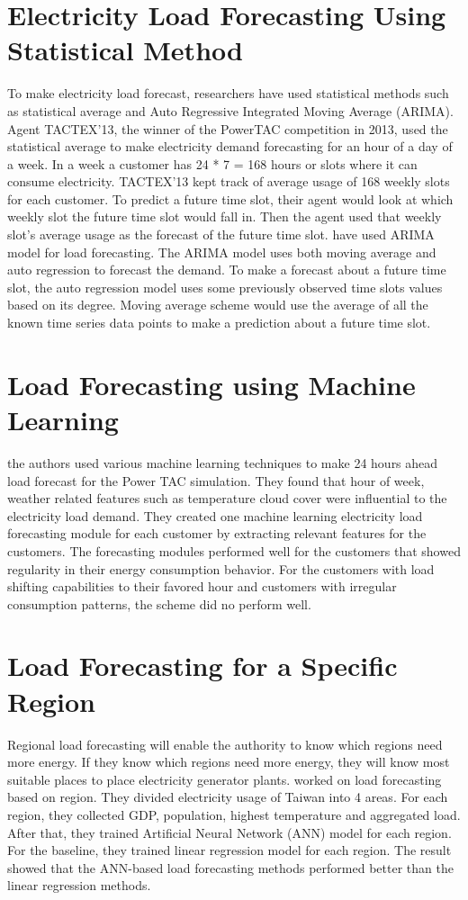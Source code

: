 \section{Electricity Load Forecasting Using Statistical Method}

To make electricity load forecast, researchers have used statistical methods such as statistical average and Auto Regressive Integrated Moving Average (ARIMA).  Agent TACTEX'13, the winner of the PowerTAC competition in 2013, used the statistical average to make electricity demand forecasting for an hour of a day of a week. In a week a customer has 24 * 7 = 168 hours or slots where it can consume electricity. TACTEX'13  kept track of average usage of 168 weekly slots for each customer. To predict a future time slot, their agent would look at which weekly slot the future time slot would fall in. Then the agent used that weekly slot's average usage as the forecast of the future time slot. \cite{cho1995customer} have used ARIMA model for load forecasting. The ARIMA model uses both moving average and auto regression to forecast the demand. To make a forecast about a future time slot, the auto regression model uses some previously observed time slots values based on its degree. Moving average scheme would use the average of all the known time series data points to make a prediction about a future time slot.    


\section{Load Forecasting using Machine Learning}
\cite{parra2013initial} the authors used various machine learning techniques to make 24 hours ahead load forecast for the Power TAC simulation. They found that hour of week, weather related features such as temperature cloud cover were influential to the electricity load demand. They created one machine learning electricity load forecasting module for each customer by extracting relevant features for the customers. The forecasting modules performed well for the customers that showed regularity in their energy consumption behavior. For the customers with load shifting capabilities to their favored hour and customers with irregular consumption patterns, the scheme did no perform well.

\section{Load Forecasting for a Specific Region}
Regional load forecasting will enable the authority to know which regions need more energy. If they know which regions need more energy, they will know most suitable places to place electricity generator plants. \cite{hsu2003regional} worked on load forecasting based on region. They divided electricity usage of Taiwan into 4 areas. For each region, they collected GDP,  population, highest temperature and aggregated load. After that, they trained Artificial Neural Network (ANN) model for each region. For the baseline, they trained linear regression model for each region. The result showed that the ANN-based load forecasting methods performed better than the linear regression  methods.


